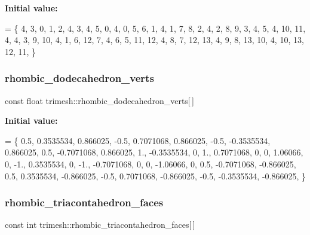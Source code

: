 {\bfseries Initial value\+:}
\begin{DoxyCode}
= \{
    4, 3, 0, 1, 2,
    4, 3, 4, 5, 0,
    4, 0, 5, 6, 1,
    4, 1, 7, 8, 2,
    4, 2, 8, 9, 3,
    4, 5, 4, 10, 11,
    4, 4, 3, 9, 10,
    4, 1, 6, 12, 7,
    4, 6, 5, 11, 12,
    4, 8, 7, 12, 13,
    4, 9, 8, 13, 10,
    4, 10, 13, 12, 11,
\}
\end{DoxyCode}
\mbox{\label{namespacetrimesh_a954e330e89455e90ae5c485f69d0de8a}} 
\subsubsection{\texorpdfstring{rhombic\+\_\+dodecahedron\+\_\+verts}{rhombic\_dodecahedron\_verts}}
{\footnotesize\ttfamily const float trimesh\+::rhombic\+\_\+dodecahedron\+\_\+verts\mbox{[}$\,$\mbox{]}\hspace{0.3cm}{\ttfamily [static]}}

{\bfseries Initial value\+:}
\begin{DoxyCode}
= \{
    0.5, 0.3535534, 0.866025,
    -0.5, 0.7071068, 0.866025,
    -0.5, -0.3535534, 0.866025,
    0.5, -0.7071068, 0.866025,
    1., -0.3535534, 0,
    1., 0.7071068, 0,
    0, 1.06066, 0,
    -1., 0.3535534, 0,
    -1., -0.7071068, 0,
    0, -1.06066, 0,
    0.5, -0.7071068, -0.866025,
    0.5, 0.3535534, -0.866025,
    -0.5, 0.7071068, -0.866025,
    -0.5, -0.3535534, -0.866025,
\}
\end{DoxyCode}
\mbox{\label{namespacetrimesh_a4ab1d73590d2ad252b5d23db85697348}} 
\subsubsection{\texorpdfstring{rhombic\+\_\+triacontahedron\+\_\+faces}{rhombic\_triacontahedron\_faces}}
{\footnotesize\ttfamily const int trimesh\+::rhombic\+\_\+triacontahedron\+\_\+faces\mbox{[}$\,$\mbox{]}\hspace{0.3cm}{\ttfamily [static]}}

\mbox{\label{namespacetrimesh_ae7583361113f4638b8153915b253fd1b}} 
